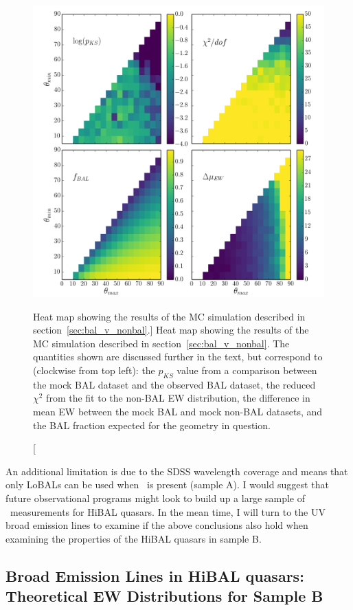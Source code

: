 \begin{figure} %
\centering
\includegraphics[width=1.0\textwidth]{figures/ewpaper/mesh4_ew_o3_max_sdss.png}
\caption
[Heat map showing the results of the MC simulation described in 
section~\ref{sec:bal_v_nonbal}.]
{
Heat map showing the results of the MC simulation described in 
section~\ref{sec:bal_v_nonbal}. The quantities shown are discussed 
further in the text, but correspond to (clockwise from top left):
the $p_{KS}$ value from a comparison between the mock BAL dataset
and the observed BAL dataset, the reduced $\chi^2$ from the fit to
the non-BAL EW distribution, the difference in mean EW between the 
mock BAL and mock non-BAL datasets, and the BAL fraction expected
for the geometry in question.
}
\label{fig:contour}
\end{figure} %

An additional limitation is due to the SDSS wavelength coverage
and means that only LoBALs can be used when \ewo\ is present (sample A).
I would suggest that future observational programs might 
look to build up a large sample of \ewo\ measurements for HiBAL
quasars. In the mean time, I will turn to the UV broad emission
lines to examine if the above conclusions also hold
when examining the properties of the HiBAL quasars in sample B.

\subsection{Broad Emission Lines in HiBAL quasars: Theoretical EW Distributions for Sample B}
\label{sec:hibal_v_nonbal}

